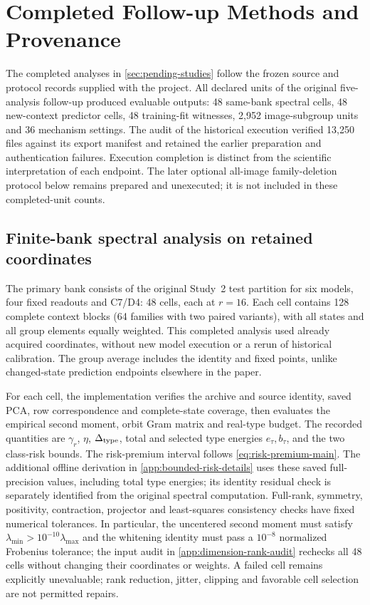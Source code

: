 \section{Completed Follow-up Methods and Provenance}
\label{app:pending-protocols}
The completed analyses in \cref{sec:pending-studies} follow the frozen source and protocol records supplied with the project. All declared units of the original five-analysis follow-up produced evaluable outputs: 48 same-bank spectral cells, 48 new-context predictor cells, 48 training-fit witnesses, 2,952 image-subgroup units and 36 mechanism settings. The audit of the historical execution verified 13,250 files against its export manifest and retained the earlier preparation and authentication failures. Execution completion is distinct from the scientific interpretation of each endpoint. The later optional all-image family-deletion protocol below remains prepared and unexecuted; it is not included in these completed-unit counts.

\subsection{Finite-bank spectral analysis on retained coordinates}
The primary bank consists of the original Study~2 test partition for six models, four fixed readouts and C7/D4: 48 cells, each at $r=16$. Each cell contains 128 complete context blocks (64 families with two paired variants), with all states and all group elements equally weighted. This completed analysis used already acquired coordinates, without new model execution or a rerun of historical calibration. The group average includes the identity and fixed points, unlike changed-state prediction endpoints elsewhere in the paper.

For each cell, the implementation verifies the archive and source identity, saved PCA, row correspondence and complete-state coverage, then evaluates the empirical second moment, orbit Gram matrix and real-type budget. The recorded quantities are $\gamma_r$, $\eta$, $\Delta_{\rm type}$, total and selected type energies $e_\tau,b_\tau$, and the two class-risk bounds. The risk-premium interval follows \cref{eq:risk-premium-main}. The additional offline derivation in \cref{app:bounded-risk-details} uses these saved full-precision values, including total type energies; its identity residual check is separately identified from the original spectral computation. Full-rank, symmetry, positivity, contraction, projector and least-squares consistency checks have fixed numerical tolerances. In particular, the uncentered second moment must satisfy $\lambda_{\min}>10^{-10}\lambda_{\max}$ and the whitening identity must pass a $10^{-8}$ normalized Frobenius tolerance; the input audit in \cref{app:dimension-rank-audit} rechecks all 48 cells without changing their coordinates or weights. A failed cell remains explicitly unevaluable; rank reduction, jitter, clipping and favorable cell selection are not permitted repairs.

